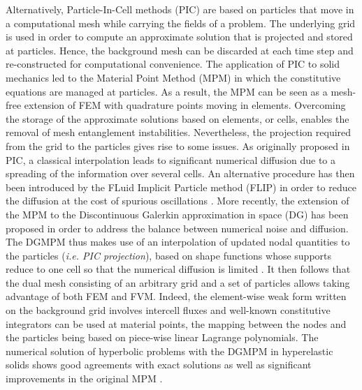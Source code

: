 Alternatively, Particle-In-Cell methods (PIC) \cite{PIC} are based on particles that move in a computational mesh while carrying the fields of a problem.
The underlying grid is used in order to compute an approximate solution that is projected and stored at particles.
Hence, the background mesh can be discarded at each time step and re-constructed for computational convenience.
The application of PIC to solid mechanics led to the Material Point Method (MPM) \cite{Sulsky94} in which the constitutive equations are managed at particles.
As a result, the MPM can be seen as a mesh-free extension of FEM with quadrature points moving in elements.
Overcoming the storage of the approximate solutions based on elements, or cells, enables the removal of mesh entanglement instabilities.
Nevertheless, the projection required from the grid to the particles gives rise to some issues.
As originally proposed in PIC, a classical interpolation leads to significant numerical diffusion due to a spreading of the information over several cells.
An alternative procedure has then been introduced by the FLuid Implicit Particle method (FLIP) \cite{FLIP0} in order to reduce the diffusion at the cost of spurious oscillations \cite{XPIC}.
More recently, the extension of the MPM to the Discontinuous Galerkin approximation in space (DG) \cite{NeutronDG} has been proposed in order to address the balance between numerical noise and diffusion.
The DGMPM \cite{DGMPM} thus makes use of an interpolation of updated nodal quantities to the particles (\textit{i.e. PIC projection}), based on shape functions whose supports reduce to one cell so that the numerical diffusion is limited \cite{Thesis}.
It then follows that the dual mesh consisting of an arbitrary grid and a set of particles allows taking advantage of both FEM and FVM.
Indeed, the element-wise weak form written on the background grid involves intercell fluxes and well-known constitutive integrators \cite{Simo} can be used at material points, the mapping between the nodes and the particles being based on piece-wise linear Lagrange polynomials.
The numerical solution of hyperbolic problems with the DGMPM in hyperelastic solids shows good agreements with exact solutions as well as significant improvements in the original MPM \cite{DGMPM}.

